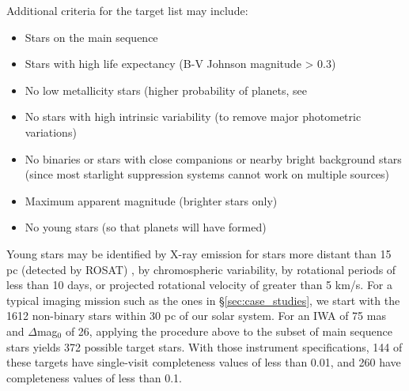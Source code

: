 Additional criteria for the target list may include:
\begin{itemize}
\item Stars on the main sequence
\item Stars with high life expectancy (B-V Johnson magnitude > 0.3)
\item No low metallicity stars (higher probability of planets, see  
\item No stars with high intrinsic variability (to remove major photometric variations)
\item No binaries or stars with close companions or nearby bright background stars (since most starlight suppression systems cannot work on multiple sources)
\item Maximum apparent magnitude (brighter stars only)
\item No young stars (so that planets will have formed)
\end{itemize}
 Young stars may be identified by X-ray emission for stars more distant than 15 pc (detected by ROSAT) \citep{guillout1999stellar}, by chromospheric variability, by rotational periods of less than 10 days, or projected rotational velocity of greater than 5 km/s. For a typical imaging mission such as the ones in \S\ref{sec:case_studies}, we start with the 1612 non-binary stars within 30 pc of our solar system.  For an IWA of 75 mas and $\Delta$mag$_0$ of 26, applying the procedure above to the subset of main sequence stars yields 372 possible target stars.  With those instrument specifications, 144 of these targets have single-visit completeness values of less than 0.01, and 260 have completeness values of less than 0.1.


